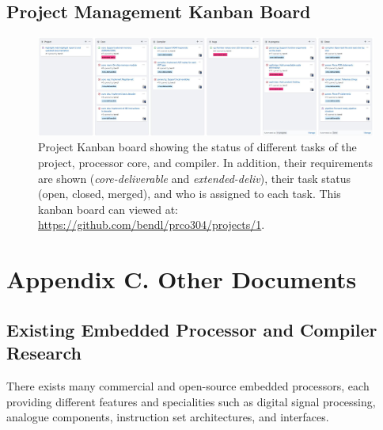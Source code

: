 \documentclass[11pt,a4paper]{report}
\begin{document}
\newpage



\newpage
\begin{landscape}
\subsection{Project Management Kanban Board}
\begin{figure}[H]
\centering
\includegraphics[scale=0.55]{kanban2}
\caption{Project Kanban board showing the status of different tasks of the project, processor core, and compiler. In addition, their requirements are shown (\textit{core-deliverable} and \textit{extended-deliv}), their task status (open, closed, merged), and who is assigned to each task. This kanban board can viewed at: \url{https://github.com/bendl/prco304/projects/1}.}
\label{kanban}
\end{figure}
\end{landscape}


\newpage
\section{Appendix C. Other Documents}
\subsection{Existing Embedded Processor and Compiler Research}
\label{current_impl}
There exists many commercial and open-source embedded processors, each providing different features and specialities such as digital signal processing, analogue components, instruction set architectures, and interfaces.
\end{document}
